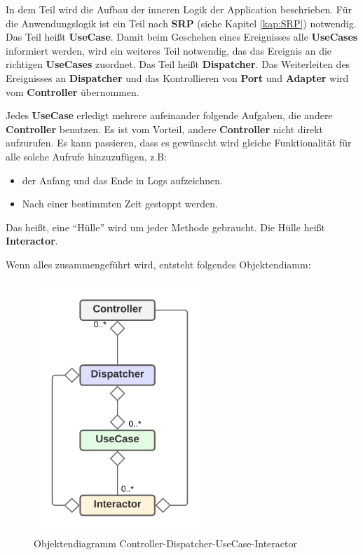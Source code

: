 In dem Teil wird die Aufbau der inneren Logik der Application beschrieben. 
Für die Anwendungslogik ist ein Teil nach \textbf{SRP} (siehe Kapitel \ref{kap:SRP}) notwendig. Das Teil heißt \textbf{UseCase}.
Damit beim Geschehen eines Ereignisses alle \textbf{UseCases} informiert werden, 
wird ein weiteres Teil notwendig, das das Ereignis an die richtigen \textbf{UseCases} zuordnet.  
Das Teil heißt \textbf{Dispatcher}.
Das Weiterleiten des Ereignisses an \textbf{Dispatcher} und das Kontrollieren von \textbf{Port} und \textbf{Adapter} wird 
vom \textbf{Controller} übernommen.

Jedes \textbf{UseCase} erledigt mehrere aufeinander folgende Aufgaben, die andere \textbf{Controller} benutzen.
Es ist vom Vorteil, andere \textbf{Controller} nicht direkt aufzurufen. 
Es kann passieren, dass es gewünscht wird gleiche Funktionalität für alle solche Aufrufe hinzuzufügen, z.B:
\begin{itemize}
    \item der Anfang und das Ende in Logs aufzeichnen.
    \item Nach einer bestimmten Zeit gestoppt werden.
\end{itemize}
Das heißt, eine ``Hülle'' wird um jeder Methode gebraucht. Die Hülle heißt \textbf{Interactor}.

Wenn alles zusammengeführt wird, entsteht folgendes Objektendiamm:

\begin{figure}[H]
    \centering
    \includegraphics[width=6.5cm]{./images/Controller-Dispatcher-UseCase-Interactor.png}
     \caption[Objektendiagramm Controller-Dispatcher-UseCase-Interactor]{Objektendiagramm Controller-Dispatcher-UseCase-Interactor}
     \label{fig:CDCDUI}
\end{figure}
